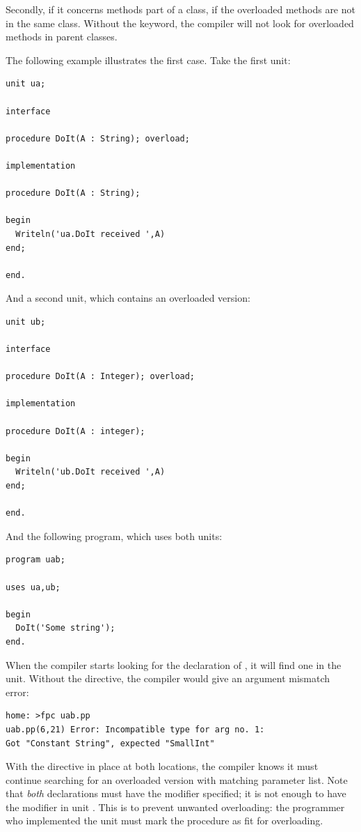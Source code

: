 Secondly, if it concerns methods part of a class, if the overloaded methods
are not in the same class. Without the  keyword, the compiler 
will not look for overloaded methods in parent classes.

The following example illustrates the first case. Take the first unit:
\begin{verbatim}
unit ua;

interface

procedure DoIt(A : String); overload;

implementation

procedure DoIt(A : String);

begin
  Writeln('ua.DoIt received ',A)
end;

end.
\end{verbatim}
And a second unit, which contains an overloaded version:
\begin{verbatim}
unit ub;

interface

procedure DoIt(A : Integer); overload;

implementation

procedure DoIt(A : integer);

begin
  Writeln('ub.DoIt received ',A)
end;

end.
\end{verbatim}
And the following program, which uses both units:
\begin{verbatim}
program uab;

uses ua,ub;

begin
  DoIt('Some string');
end.
\end{verbatim}
When the compiler starts looking for the declaration of , it will
find one in the  unit. Without the  directive, the
compiler would give an argument mismatch error:
\begin{verbatim}
home: >fpc uab.pp
uab.pp(6,21) Error: Incompatible type for arg no. 1:
Got "Constant String", expected "SmallInt"
\end{verbatim}
With the  directive in place at both locations, the compiler
knows it must continue searching for an overloaded version with matching
parameter list. Note that {\em both} declarations must have the
 modifier specified; it is not enough to have the modifier in
unit . This is to prevent unwanted overloading: the programmer who
implemented the  unit must mark the procedure as fit for overloading.

